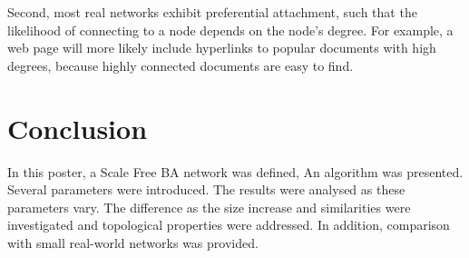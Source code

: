 \documentclass[a0,final]{a0poster}
\begin{document}
\begin{multicols}{3}
Second, most real networks exhibit preferential attachment, such that the likelihood of connecting to a node depends on the node’s degree. For example, a web page will more likely include hyperlinks to popular documents with high degrees, because highly connected documents are easy to find. 




\section*{Conclusion}
In this poster, a Scale Free BA network was defined, An algorithm was presented. Several parameters were introduced. The results were analysed as these parameters vary. The difference as the size increase and similarities were investigated and topological properties were addressed. In addition, comparison with small real-world networks was provided. 




\end{multicols}
\end{document}
